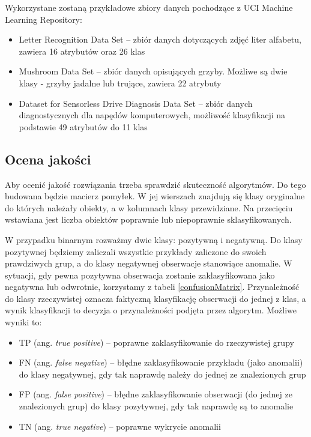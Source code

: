 \documentclass[11pt,a4paper,twoside]{article}
\begin{document}
Wykorzystane zostaną przykładowe zbiory danych pochodzące z UCI Machine Learning Repository:
\begin{itemize}
\item Letter Recognition Data Set -- zbiór danych dotyczących zdjęć liter alfabetu,  zawiera 16 atrybutów oraz 26 klas
\item Mushroom Data Set -- zbiór danych opisujących grzyby. Możliwe są dwie klasy - grzyby jadalne lub trujące, zawiera 22 atrybuty
\item Dataset for Sensorless Drive Diagnosis Data Set -- zbiór danych diagnostycznych dla napędów komputerowych, możliwość klasyfikacji na podstawie 49 atrybutów do 11 klas
\end{itemize}

\subsection{Ocena jakości}
Aby ocenić jakość rozwiązania trzeba sprawdzić skuteczność algorytmów. Do tego budowana będzie macierz pomyłek. W jej wierszach znajdują się klasy oryginalne do których należały obiekty, a w kolumnach klasy przewidziane. Na przecięciu wstawiana jest liczba obiektów poprawnie lub niepoprawnie sklasyfikowanych. 

W przypadku binarnym rozważmy dwie klasy: pozytywną i negatywną. Do klasy pozytywnej będziemy zaliczali wszystkie przykłady zaliczone do swoich prawdziwych grup, a do klasy negatywnej obserwacje stanowiące anomalie. W sytuacji, gdy pewna pozytywna obserwacja zostanie zaklasyfikowana jako negatywna lub odwrotnie, korzystamy z tabeli \ref{confusionMatrix}. Przynależność do klasy rzeczywistej oznacza faktyczną klasyfikację obserwacji do jednej z klas, a wynik klasyfikacji to decyzja o przynależności podjęta przez algorytm. Możliwe wyniki to:
\begin{itemize}[label={--}]
\item TP (ang. \emph{true positive}) -- poprawne zaklasyfikowanie do rzeczywistej grupy
\item FN (ang. \emph{false negative}) -- błędne zaklasyfikowanie przykładu (jako anomalii) do klasy negatywnej, gdy tak naprawdę należy do jednej ze znalezionych grup
\item FP (ang. \emph{false positive}) -- błędne zaklasyfikowanie obserwacji (do jednej ze znalezionych grup) do klasy pozytywnej, gdy tak naprawdę są to anomalie
\item TN (ang. \emph{true negative}) -- poprawne wykrycie anomalii
\end{itemize}
\end{document}
